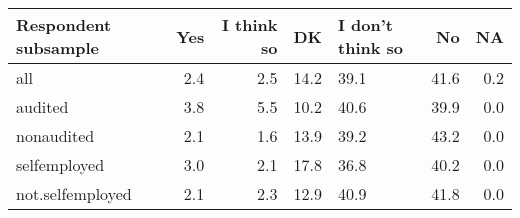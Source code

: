 \begin{table}[ht]
\centering
\begin{tabular}{lrrrL{2cm}rr}
  \hline
Respondent subsample & Yes & I think so & DK & I don't think so & No & NA \\ 
  \hline
all & 2.4 & 2.5 & 14.2 & 39.1 & 41.6 & 0.2 \\ 
  audited & 3.8 & 5.5 & 10.2 & 40.6 & 39.9 & 0.0 \\ 
  nonaudited & 2.1 & 1.6 & 13.9 & 39.2 & 43.2 & 0.0 \\ 
  selfemployed & 3.0 & 2.1 & 17.8 & 36.8 & 40.2 & 0.0 \\ 
  not.selfemployed & 2.1 & 2.3 & 12.9 & 40.9 & 41.8 & 0.0 \\ 
   \hline
\end{tabular}
\end{table}
